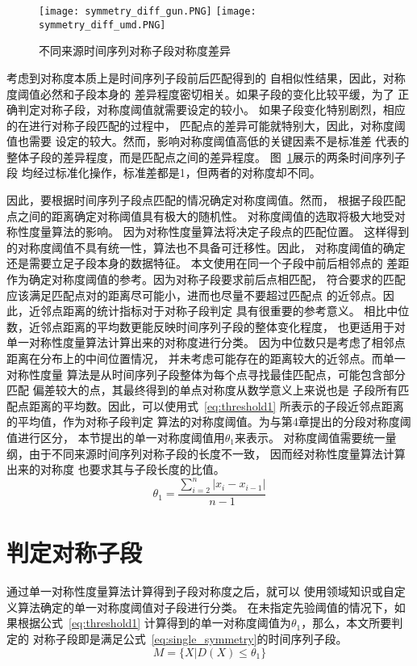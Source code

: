 \begin{figure}
  \centering
  {\texttt{[image: symmetry\_diff\_gun.PNG]}}
  {\texttt{[image: symmetry\_diff\_umd.PNG]}}
  \caption{不同来源时间序列对称子段对称度差异}
  \label{fig:symmetry_diff}
\end{figure}

考虑到对称度本质上是时间序列子段前后匹配得到的
自相似性结果，因此，对称度阈值必然和子段本身的
差异程度密切相关。如果子段的变化比较平缓，为了
正确判定对称子段，对称度阈值就需要设定的较小。
如果子段变化特别剧烈，相应的在进行对称子段匹配的过程中，
匹配点的差异可能就特别大，因此，对称度阈值也需要
设定的较大。然而，影响对称度阈值高低的关键因素不是标准差
代表的整体子段的差异程度，而是匹配点之间的差异程度。
图~\ref{fig:symmetry_diff}展示的两条时间序列子段
均经过标准化操作，标准差都是1，但两者的对称度却不同。

因此，要根据时间序列子段点匹配的情况确定对称度阈值。然而，
根据子段匹配点之间的距离确定对称阈值具有极大的随机性。
对称度阈值的选取将极大地受对称性度量算法的影响。
因为对称性度量算法将决定子段点的匹配位置。
这样得到的对称度阈值不具有统一性，算法也不具备可迁移性。因此，
对称度阈值的确定还是需要立足子段本身的数据特征。
本文使用在同一个子段中前后相邻点的
差距作为确定对称度阈值的参考。因为对称子段要求前后点相匹配，
符合要求的匹配应该满足匹配点对的距离尽可能小，进而也尽量不要超过匹配点
的近邻点。因此，近邻点距离的统计指标对于对称子段判定
具有很重要的参考意义。
相比中位数，近邻点距离的平均数更能反映时间序列子段的整体变化程度，
也更适用于对单一对称性度量算法计算出来的对称度进行分类。
因为中位数只是考虑了相邻点距离在分布上的中间位置情况，
并未考虑可能存在的距离较大的近邻点。而单一对称性度量
算法是从时间序列子段整体为每个点寻找最佳匹配点，可能包含部分匹配
偏差较大的点，其最终得到的单点对称度从数学意义上来说也是
子段所有匹配点距离的平均数。因此，可以使用式~\ref{eq:threshold1}
所表示的子段近邻点距离的平均值，作为对称子段判定
算法的对称度阈值。为与第4章提出的分段对称度阈值进行区分，
本节提出的单一对称度阈值用$\theta_1$来表示。
对称度阈值需要统一量纲，由于不同来源时间序列对称子段的长度不一致，
因而经对称性度量算法计算出来的对称度
也要求其与子段长度的比值。
\begin{equation}
  \theta_{1}=\frac{\sum_{i=2}^{n}\left|x_{i}-x_{i-1}\right|}{n-1}
  \label{eq:threshold1}
\end{equation}

\section{判定对称子段}
通过单一对称性度量算法计算得到子段对称度之后，就可以
使用领域知识或自定义算法确定的单一对称度阈值对子段进行分类。
在未指定先验阈值的情况下，如果根据公式~\ref{eq:threshold1}
计算得到的单一对称度阈值为$\theta_1$，那么，本文所要判定的
对称子段即是满足公式~\ref{eq:single_symmetry}的时间序列子段。
\begin{equation}
  M = \{X|D(X)\leq\theta_1\}
  \label{eq:single_symmetry}
\end{equation}

